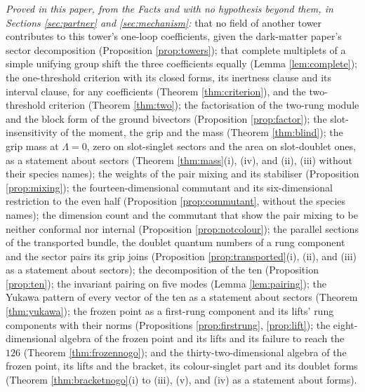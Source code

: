 \documentclass[11pt]{article}
\theoremstyle{definition}
\begin{document}
\emph{Proved in this paper, from the Facts and with no hypothesis beyond them, in Sections \ref{sec:partner} and \ref{sec:mechanism}:} that no field of another tower contributes to this tower's one-loop coefficients, given the dark-matter paper's sector decomposition (Proposition \ref{prop:towers}); that complete multiplets of a simple unifying group shift the three coefficients equally (Lemma \ref{lem:complete}); the one-threshold criterion with its closed forms, its inertness clause and its interval clause, for any coefficients (Theorem \ref{thm:criterion}), and the two-threshold criterion (Theorem \ref{thm:two}); the factorisation of the two-rung module and the block form of the ground bivectors (Proposition \ref{prop:factor}); the slot-insensitivity of the moment, the grip and the mass (Theorem \ref{thm:blind}); the grip mass at $\Lambda = 0$, zero on slot-singlet sectors and the area on slot-doublet ones, as a statement about sectors (Theorem \ref{thm:mass}(i), (iv), and (ii), (iii) without their species names); the weights of the pair mixing and its stabiliser (Proposition \ref{prop:mixing}); the fourteen-dimensional commutant and its six-dimensional restriction to the even half (Proposition \ref{prop:commutant}, without the species names); the dimension count and the commutant that show the pair mixing to be neither conformal nor internal (Proposition \ref{prop:notcolour}); the parallel sections of the transported bundle, the doublet quantum numbers of a rung component and the sector pairs its grip joins (Proposition \ref{prop:transported}(i), (ii), and (iii) as a statement about sectors); the decomposition of the ten (Proposition \ref{prop:ten}); the invariant pairing on five modes (Lemma \ref{lem:pairing}); the Yukawa pattern of every vector of the ten as a statement about sectors (Theorem \ref{thm:yukawa}); the frozen point as a first-rung component and its lifts' rung components with their norms (Propositions \ref{prop:firstrung}, \ref{prop:lift}); the eight-dimensional algebra of the frozen point and its lifts and its failure to reach the $126$ (Theorem \ref{thm:frozennogo}); and the thirty-two-dimensional algebra of the frozen point, its lifts and the bracket, its colour-singlet part and its doublet forms (Theorem \ref{thm:bracketnogo}(i) to (iii), (v), and (iv) as a statement about forms).
\end{document}
